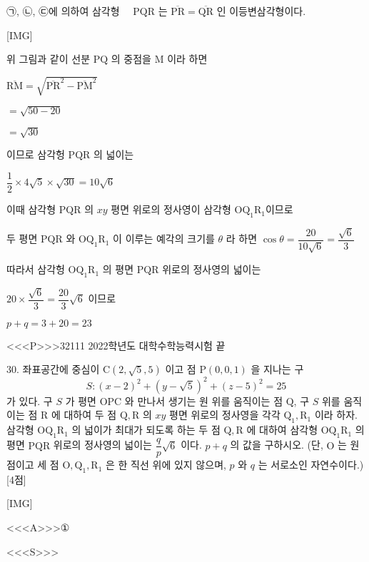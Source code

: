 \documentclass{oblivoir}
\begin{document}
㉠, ㉡, ㉢에 의하여 삼각형 $\quad \mathrm{PQR}$ 는 $\overline{\mathrm{PR}}=\overline{\mathrm{QR}}$ 인 이등변삼각형이다.

[IMG]

위 그림과 같이 선분 $\mathrm{PQ}$ 의 중점을 $\mathrm{M}$ 이라 하면

$\overline{\mathrm{RM}} =\sqrt{\overline{\mathrm{PR}}^{2}-\overline{\mathrm{PM}}^{2}}$

$=\sqrt{50-20}$

$=\sqrt{30}$

이므로 삼각헝 $\mathrm{PQR}$ 의 넓이는

$\dfrac{1}{2} \times 4 \sqrt{5} \times \sqrt{30}=10 \sqrt{6}$

이때 삼각형 $\mathrm{PQR}$ 의 $x y$ 평면 위로의 정사영이 삼각형 $\mathrm{OQ}_{1} \mathrm{R}_{1}$이므로 

두 평면 $\mathrm{PQR}$ 와 $\mathrm{OQ}_{1} \mathrm{R}_{1}$ 이 이루는 예각의 크기를 $\theta$ 라 하면
$\cos \theta=\dfrac{20}{10 \sqrt{6}}=\dfrac{\sqrt{6}}{3}$

따라서 삼각헝 $\mathrm{OQ}_{1} \mathrm{R}_{1}$ 의 평면 $\mathrm{PQR}$ 위로의 정사영의 넓이는

$20 \times \dfrac{\sqrt{6}}{3}=\dfrac{20}{3} \sqrt{6}$
이므로

$p+q=3+20=23$



<<<P>>>32111 2022학년도 대학수학능력시험 끝

30. 좌표공간에 중심이 $\mathrm{C}(2, \sqrt{5}, 5)$ 이고 점 $\mathrm{P}(0,0,1)$ 을 지나는 구
$$
S:(x-2)^{2}+(y-\sqrt{5})^{2}+(z-5)^{2}=25
$$
가 있다. 구 $S$ 가 평면 $\mathrm{OPC}$ 와 만나서 생기는 원 위를 움직이는 점 $\mathrm{Q}$, 구 $S$ 위를 움직이는 점 $\mathrm{R}$ 에 대하여 두 점 $\mathrm{Q}, \mathrm{R}$ 의 $x y$ 평면 위로의 정사영을 각각 $\mathrm{Q}_{1}, \mathrm{R}_{1}$ 이라 하자.
삼각형 $\mathrm{OQ}_{1} \mathrm{R}_{1}$ 의 넓이가 최대가 되도록 하는 두 점 $\mathrm{Q}, \mathrm{R}$ 에 대하여 삼각형 $\mathrm{OQ}_{1} \mathrm{R}_{1}$ 의 평면 $\mathrm{PQR}$ 위로의 정사영의 넓이는 $\dfrac{q}{p} \sqrt{6}$ 이다. $p+q$ 의 값을 구하시오.
(단, $\mathrm{O}$ 는 원점이고 세 점 $\mathrm{O}, \mathrm{Q}_{1}, \mathrm{R}_{1}$ 은 한 직선 위에 있지 않으며, $p$ 와 $q$ 는 서로소인 자연수이다.) [4점]

[IMG]








<<<A>>>①

<<<S>>>
\end{document}
